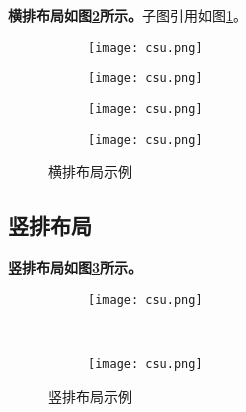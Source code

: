 \textbf{横排布局如图\ref{F.csu_row}所示。}子图引用如图\ref{f:subfig}。

\begin{figure}[!htb]
    \centering
    \begin{subfigure}[t]{0.24\linewidth}
        \begin{minipage}[b]{1\linewidth}
        \texttt{[image: csu.png]}
        \end{minipage}
        \caption{}
        \label{f:subfig}
    \end{subfigure}
    \begin{subfigure}[t]{0.24\linewidth}
        \begin{minipage}[b]{1\linewidth}
        \texttt{[image: csu.png]}
        \end{minipage}
        \caption{}
    \end{subfigure}
    \begin{subfigure}[t]{0.24\linewidth}
        \begin{minipage}[b]{1\linewidth}
        \texttt{[image: csu.png]}
        \end{minipage}
        \caption{}
    \end{subfigure}
    \begin{subfigure}[t]{0.24\linewidth}
        \begin{minipage}[b]{1\linewidth}
        \texttt{[image: csu.png]}
        \end{minipage}
        \caption{}
    \end{subfigure}
    \caption{横排布局示例}
    \label{F.csu_row}
\end{figure}

\lipsum

\subsection{竖排布局}
\textbf{竖排布局如图\ref{F.csu_col}所示。}

\begin{figure}[!htb]
    \centering
    \begin{subfigure}[t]{0.15\linewidth}
        \begin{minipage}[b]{1\linewidth}
        \texttt{[image: csu.png]}
        \end{minipage}
        \caption{}
    \end{subfigure}\\
    \begin{subfigure}[t]{0.15\linewidth}
        \begin{minipage}[b]{1\linewidth}
        \texttt{[image: csu.png]}
        \end{minipage}
        \caption{}
    \end{subfigure}
    \caption{竖排布局示例}
    \label{F.csu_col}
\end{figure}

